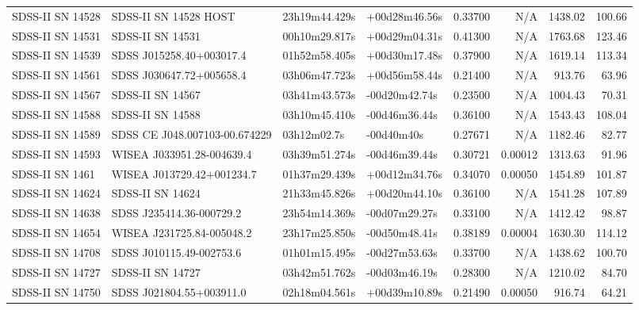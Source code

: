 \begin{longtable}{llllrrrr}
SDSS-II SN 14528 &           SDSS-II SN 14528 HOST &   23h19m44.429s &   +00d28m46.56s &  0.33700 &      N/A &  1438.02 &      100.66 \\
SDSS-II SN 14531 &                SDSS-II SN 14531 &   00h10m29.817s &   +00d29m04.31s &  0.41300 &      N/A &  1763.68 &      123.46 \\
SDSS-II SN 14539 &        SDSS J015258.40+003017.4 &   01h52m58.405s &   +00d30m17.48s &  0.37900 &      N/A &  1619.14 &      113.34 \\
SDSS-II SN 14561 &        SDSS J030647.72+005658.4 &   03h06m47.723s &   +00d56m58.44s &  0.21400 &      N/A &   913.76 &       63.96 \\
SDSS-II SN 14567 &                SDSS-II SN 14567 &   03h41m43.573s &   -00d20m42.74s &  0.23500 &      N/A &  1004.43 &       70.31 \\
SDSS-II SN 14588 &                SDSS-II SN 14588 &   03h10m45.410s &   -00d46m36.44s &  0.36100 &      N/A &  1543.43 &      108.04 \\
SDSS-II SN 14589 &  SDSS CE J048.007103-00.674229  &     03h12m02.7s &      -00d40m40s &  0.27671 &      N/A &  1182.46 &       82.77 \\
SDSS-II SN 14593 &       WISEA J033951.28-004639.4 &   03h39m51.274s &   -00d46m39.44s &  0.30721 &  0.00012 &  1313.63 &       91.96 \\
SDSS-II SN 1461  &       WISEA J013729.42+001234.7 &   01h37m29.439s &   +00d12m34.76s &  0.34070 &  0.00050 &  1454.89 &      101.87 \\
SDSS-II SN 14624 &                SDSS-II SN 14624 &   21h33m45.826s &   +00d20m44.10s &  0.36100 &      N/A &  1541.28 &      107.89 \\
SDSS-II SN 14638 &        SDSS J235414.36-000729.2 &   23h54m14.369s &   -00d07m29.27s &  0.33100 &      N/A &  1412.42 &       98.87 \\
SDSS-II SN 14654 &       WISEA J231725.84-005048.2 &   23h17m25.850s &   -00d50m48.41s &  0.38189 &  0.00004 &  1630.30 &      114.12 \\
SDSS-II SN 14708 &        SDSS J010115.49-002753.6 &   01h01m15.495s &   -00d27m53.63s &  0.33700 &      N/A &  1438.62 &      100.70 \\
SDSS-II SN 14727 &                SDSS-II SN 14727 &   03h42m51.762s &   -00d03m46.19s &  0.28300 &      N/A &  1210.02 &       84.70 \\
SDSS-II SN 14750 &        SDSS J021804.55+003911.0 &   02h18m04.561s &   +00d39m10.89s &  0.21490 &  0.00050 &   916.74 &       64.21 \\

\end{longtable}
